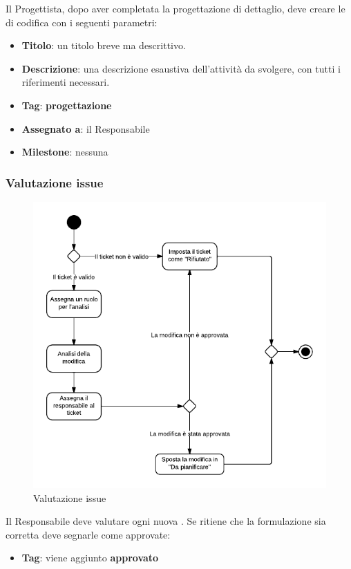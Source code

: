 Il Progettista, dopo aver completata la progettazione di dettaglio, deve creare le  di codifica con i seguenti parametri:
\begin{itemize}
 \item \textbf{Titolo}: un titolo breve ma descrittivo.
 \item \textbf{Descrizione}: una descrizione esaustiva dell'attività da svolgere, con tutti i riferimenti necessari.
 \item \textbf{Tag}: \textbf{progettazione}
 \item \textbf{Assegnato a}: il Responsabile
 \item \textbf{Milestone}: nessuna
\end{itemize}

\subsubsection{Valutazione issue}

\begin{figure}[H]
    \centering
    \includegraphics[width=1.2\textwidth]{uml-processi/valutazione_issue.png}
    \caption{Valutazione issue}
\end{figure}

Il Responsabile deve valutare ogni nuova . Se ritiene che la formulazione sia corretta deve segnarle come approvate:
\begin{itemize}
 \item \textbf{Tag}: viene aggiunto \textbf{approvato}
\end{itemize}

